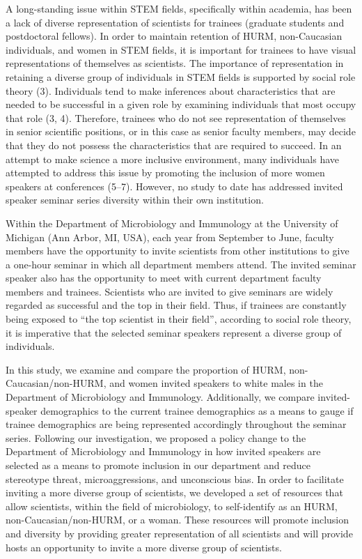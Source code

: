\documentclass[10pt,]{article}
\begin{document}
A long-standing issue within STEM fields, specifically within academia,
has been a lack of diverse representation of scientists for trainees
(graduate students and postdoctoral fellows). In order to maintain
retention of HURM, non-Caucasian individuals, and women in STEM fields,
it is important for trainees to have visual representations of
themselves as scientists. The importance of representation in retaining
a diverse group of individuals in STEM fields is supported by social
role theory (3). Individuals tend to make inferences about
characteristics that are needed to be successful in a given role by
examining individuals that most occupy that role (3, 4). Therefore,
trainees who do not see representation of themselves in senior
scientific positions, or in this case as senior faculty members, may
decide that they do not possess the characteristics that are required to
succeed. In an attempt to make science a more inclusive environment,
many individuals have attempted to address this issue by promoting the
inclusion of more women speakers at conferences (5--7). However, no
study to date has addressed invited speaker seminar series diversity
within their own institution.

Within the Department of Microbiology and Immunology at the University
of Michigan (Ann Arbor, MI, USA), each year from September to June,
faculty members have the opportunity to invite scientists from other
institutions to give a one-hour seminar in which all department members
attend. The invited seminar speaker also has the opportunity to meet
with current department faculty members and trainees. Scientists who are
invited to give seminars are widely regarded as successful and the top
in their field. Thus, if trainees are constantly being exposed to ``the
top scientist in their field'', according to social role theory, it is
imperative that the selected seminar speakers represent a diverse group
of individuals.

In this study, we examine and compare the proportion of HURM,
non-Caucasian/non-HURM, and women invited speakers to white males in the
Department of Microbiology and Immunology. Additionally, we compare
invited-speaker demographics to the current trainee demographics as a
means to gauge if trainee demographics are being represented accordingly
throughout the seminar series. Following our investigation, we proposed
a policy change to the Department of Microbiology and Immunology in how
invited speakers are selected as a means to promote inclusion in our
department and reduce stereotype threat, microaggressions, and
unconscious bias. In order to facilitate inviting a more diverse group
of scientists, we developed a set of resources that allow scientists,
within the field of microbiology, to self-identify as an HURM,
non-Caucasian/non-HURM, or a woman. These resources will promote
inclusion and diversity by providing greater representation of all
scientists and will provide hosts an opportunity to invite a more
diverse group of scientists.
\end{document}
